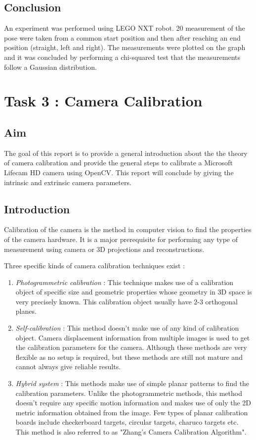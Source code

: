 \subsection{Conclusion}
An experiment was performed using LEGO NXT robot. 
20 measurement of the pose were taken from a common start position and then after reaching an end position (straight, left and right).
The measurements were plotted on the graph and it was concluded by performing a chi-squared test that the measurements follow a Gaussian distribution. 

\newpage
\section{Task 3 : Camera Calibration}

\subsection{Aim}

The goal of this report is to provide a general introduction about the the theory of camera calibration and provide the general steps to calibrate a Microsoft Lifecam HD camera using OpenCV. This report will conclude by giving the intrinsic and extrinsic camera parameters.


\subsection{Introduction}
Calibration of the camera is the method in computer vision to find the properties of the camera hardware. It is a major prerequisite for performing any type of measurement using camera or 3D projections and reconstructions. 

Three specific kinds of camera calibration techniques exist :
\begin{enumerate}
	\item \textit{Photogrammetric calibration} : This technique makes use of a calibration object of specific size and geometric properties whose geometry in 3D space is very precisely known. This calibration object usually have 2-3 orthogonal planes. 
	\item \textit{Self-calibration} : This method doesn't make use of any kind of calibration object. Camera displacement information from multiple images is used to get the calibration parameters for the camera. Although these methods are very flexible as no setup is required, but these methods are still not mature and cannot always give reliable results. 
	\item \textit{Hybrid system} : This methods make use of simple planar patterns to find the calibration parameters. Unlike the photogrammetric methods, this method doesn't require any specific motion information and makes use of only the 2D metric information obtained from the image.  Few types of planar calibration boards include checkerboard targets, circular targets, charuco targets etc.  This method is also referred to as "Zhang's Camera Calibration Algorithm".
\end{enumerate}

